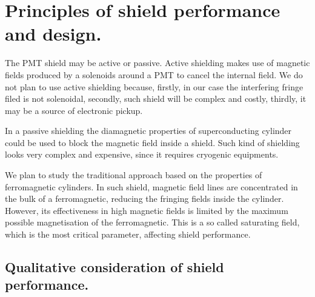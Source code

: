 \documentclass[12pt]{article}
\begin{document}
\section{ Principles of shield performance and design.}

The   PMT shield may be active or passive.
Active shielding makes use of  magnetic fields produced by a  solenoids  around a PMT to
cancel the internal  field. We do not plan to use active shielding
because, firstly,  in our case the  interfering  fringe  filed
is  not solenoidal, secondly,  such shield  will be  complex and costly,
thirdly, it may be a source of  electronic pickup.

In a passive shielding  the diamagnetic properties
of superconducting cylinder could be  used to block the magnetic field  inside a shield.
Such  kind of shielding looks very complex and expensive, since it requires cryogenic equipments.

We plan to study the  traditional approach  based on the  properties of 
ferromagnetic cylinders.
In such shield, magnetic field lines are concentrated in the bulk of a
ferromagnetic, reducing the fringing fields inside the cylinder.
However, its effectiveness  in high magnetic fields is limited by the
maximum possible magnetisation of  the  ferromagnetic.
This is a so called  saturating field, 
which  is the most critical parameter, affecting shield performance.


%
%
\subsection{Qualitative consideration of  shield performance.}
\end{document}
